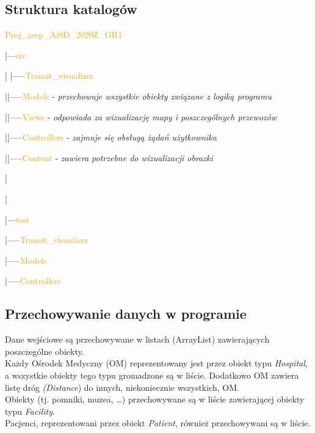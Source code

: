 \documentclass[]{article}
\begin{document}
    \subsection{Struktura katalogów} %
    \textcolor{orange}{Proj\_zesp\_AiSD\_2020Z\_GR1}

    |---\textcolor{orange}{src}

    |\hspace{4mm} |-----\textcolor{orange}{Transit\_visualizer}

    |\hspace{15mm}|-----\textcolor{orange}{Models} - \textit{przechowuje wszystkie obiekty związane z logiką programu}

    |\hspace{15mm}|-----\textcolor{orange}{Views} -\textit{ odpowiada za wizualizację mapy i poszczególnych przewozów}

    |\hspace{15mm}|-----\textcolor{orange}{Controllers} -\textit{ zajmuje się obsługą żądań użytkownika}

    |\hspace{15mm}|-----\textcolor{orange}{Content} -\textit{ zawiera potrzebne do wizualizacji obrazki}

    |

    |

    |---\textcolor{orange}{test}

    \hspace{5mm} |-----\textcolor{orange}{Transit\_visualizer}

    \hspace{16mm}|-----\textcolor{orange}{Models}

    \hspace{16mm}|-----\textcolor{orange}{Controllers}

    \subsection{Przechowywanie danych w programie} %
    Dane wejściowe są przechowywane w listach (ArrayList) zawierających poszczególne obiekty. \\
    Każdy Ośrodek Medyczny (OM) reprezentowany jest przez obiekt typu\textit{ Hospital}, a wszystkie obiekty tego typu gromadzone są w liście. Dodatkowo OM zawiera listę dróg \textit{(Distance}) do innych, niekoniecznie wszystkich, OM.\\
    Obiekty (tj. pomniki, muzea, \ldots) przechowywane są w liście zawierającej obiekty typu \textit{Facility}.\\
    Pacjenci, reprezentowani przez obiekt \textit{Patient}, również przechowywani są w liście.\\
\end{document}
